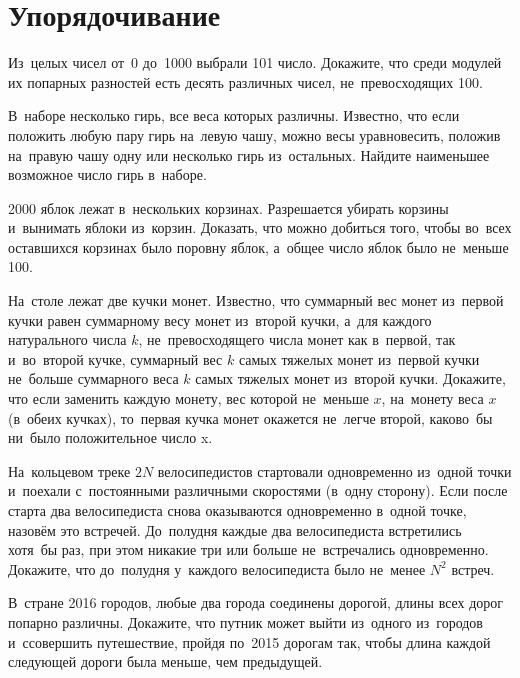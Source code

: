 
\section*{Упорядочивание}


\begin{problems}

\item
Из~целых чисел от~0 до~1000 выбрали 101 число.
Докажите, что среди модулей их попарных разностей есть десять различных чисел,
не~превосходящих 100.

\item
В~наборе несколько гирь, все веса которых различны.
Известно, что если положить любую пару гирь на~левую чашу, можно весы
уравновесить, положив на~правую чашу одну или несколько гирь из~остальных.
Найдите наименьшее возможное число гирь в~наборе.

\item
2000 яблок лежат в~нескольких корзинах.
Разрешается убирать корзины и~вынимать яблоки из~корзин.
Доказать, что можно добиться того, чтобы во~всех оставшихся корзинах было
поровну яблок, а~общее число яблок было не~меньше 100.


\item
На~столе лежат две кучки монет.
Известно, что суммарный вес монет из~первой кучки равен суммарному весу монет
из~второй кучки, а~для каждого натурального числа $k$, не~превосходящего числа
монет как в~первой, так и~во~второй кучке, суммарный вес $k$ самых тяжелых
монет из~первой кучки не~больше суммарного веса $k$ самых тяжелых монет
из~второй кучки.
Докажите, что если заменить каждую монету, вес которой не~меньше $x$, на~монету
веса $x$ (в~обеих кучках), то~первая кучка монет окажется не~легче второй,
каково~бы ни~было положительное число x.

\item
На~кольцевом треке $2N$ велосипедистов стартовали одновременно из~одной точки
и~поехали с~постоянными различными скоростями (в~одну сторону).
Если после старта два
велосипедиста снова оказываются одновременно в~одной точке, назовём это
встречей.
До~полудня каждые два велосипедиста встретились хотя~бы раз, при этом никакие
три или
больше не~встречались одновременно.
Докажите, что до~полудня у~каждого велосипедиста
было не~менее $N^2$ встреч.

\item
В~стране 2016 городов, любые два города соединены дорогой, длины всех дорог
попарно различны.
Докажите, что путник может выйти из~одного из~городов и~ссовершить путешествие,
пройдя по~2015 дорогам так, чтобы длина каждой следующей дороги была меньше,
чем предыдущей.

\end{problems}

